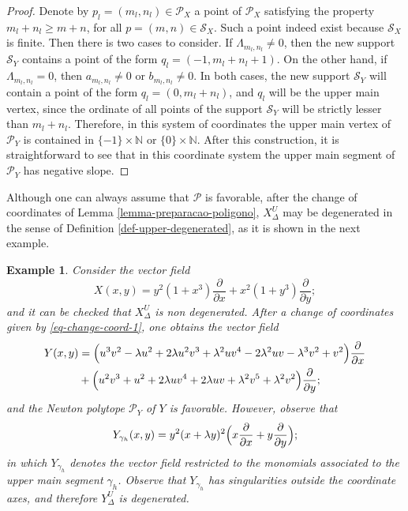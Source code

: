 \documentclass[12pt]{amsart}
\newtheorem{example}[theorem]{Example}
\begin{document}
\begin{proof}
Denote by $p_{l} = (m_{l},n_{l})\in\mathcal{P}_{X}$ a point of $\mathcal{P}_{X}$ satisfying the property $m_{l} + n_{l} \geq m + n$, for all $p = (m,n)\in\mathcal{S}_{X}$. Such a point indeed exist because $\mathcal{S}_{X}$ is finite. Then there is two cases to consider. If $\Lambda_{m_{l},n_{l}}\neq 0$, then the new support $\mathcal{S}_{Y}$ contains a point of the form $ q_{l} = (-1,m_{l} + n_{l} +1)$. On the other hand, if $\Lambda_{m_{l},n_{l}} = 0$, then $a_{m_{l},n_{l}} \neq 0$ or $b_{m_{l},n_{l}} \neq 0$. In both cases, the new support $\mathcal{S}_{Y}$ will contain a point of the form $q_{l} = (0,m_{l} + n_{l})$, and $q_{l}$ will be the upper main vertex, since the ordinate of all points of the support $\mathcal{S}_{Y}$ will be strictly lesser than $m_{l} + n_{l}$. Therefore, in this system of coordinates the upper main vertex of $\mathcal{P}_{Y}$ is contained in $\{-1\}\times\mathbb{N}$ or $\{0\}\times\mathbb{N}$. After this construction, it is straightforward to see that in this coordinate system the upper main segment of $\mathcal{P}_{Y}$ has negative slope.
\end{proof}

Although one can always assume that $\mathcal{P}$ is favorable, after the change of coordinates of Lemma \ref{lemma-preparacao-poligono}, $X^{U}_{\Delta}$ may be degenerated in the sense of Definition \ref{def-upper-degenerated}, as it is shown in the next example.  

\begin{example}
Consider the vector field
$$X(x,y) = y^{2}(1+x^{3})\displaystyle\frac{\partial}{\partial x} + x^{2}(1+y^{3})\displaystyle\frac{\partial}{\partial y};$$
and it can be checked that $X^{U}_{\Delta}$ is non degenerated. After a change of coordinates given by \eqref{eq-change-coord-1}, one obtains the vector field
\begin{equation*}
\begin{split}
Y(x,y) & = \Big{(}u^{3}v^{2} - \lambda u^{2} + 2\lambda  u^{2}v^{3} + \lambda^2 uv^{4} - 2\lambda^{2}uv - \lambda^{3}v^{2} + v^{2}\Big{)}\displaystyle\frac{\partial}{\partial x} \\
& + \Big{(} u^{2}v^{3} + u^{2} + 2\lambda uv^{4} + 2\lambda  uv + \lambda^{2}v^{5} + \lambda^{2}v^{2} \Big{)}\displaystyle\frac{\partial}{\partial y};
\end{split}
\end{equation*}
and the Newton polytope $\mathcal{P}_{Y}$ of $Y$ is favorable. However, observe that
$$
Y_{\gamma_{h}}(x,y) = y^{2}(x + \lambda y)^{2}\Big{(}x\displaystyle\frac{\partial}{\partial x} + y\displaystyle\frac{\partial}{\partial y}\Big{)};
$$
in which $Y_{\gamma_{h}}$ denotes the vector field restricted to the monomials associated to the upper main segment $\gamma_{h}$. Observe that $Y_{\gamma_{h}}$ has singularities outside the coordinate axes, and therefore $Y^{U}_{\Delta}$ is degenerated.
\end{example}
\end{document}
